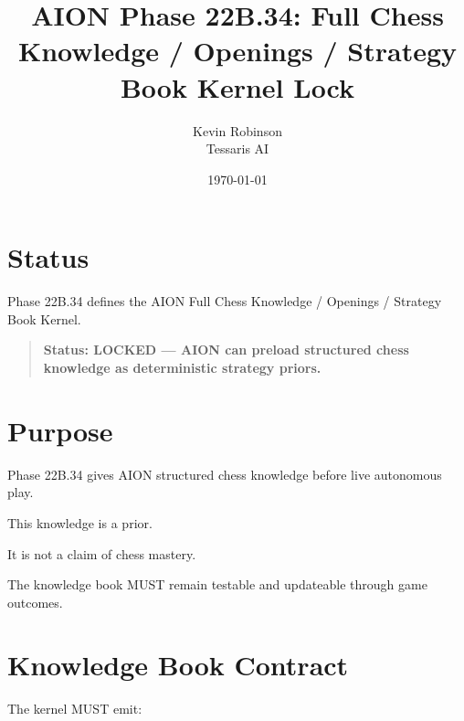 \documentclass[11pt,a4paper]{article}
\title{\textbf{AION Phase 22B.34: Full Chess Knowledge / Openings / Strategy Book Kernel Lock}}
\author{Kevin Robinson\\Tessaris AI}
\date{\today}
\begin{document}
\maketitle

\section{Status}

Phase 22B.34 defines the AION Full Chess Knowledge / Openings / Strategy Book Kernel.

\begin{quote}
\textbf{Status: LOCKED --- AION can preload structured chess knowledge as deterministic strategy priors.}
\end{quote}

\section{Purpose}

Phase 22B.34 gives AION structured chess knowledge before live autonomous play.

This knowledge is a prior.

It is not a claim of chess mastery.

The knowledge book MUST remain testable and updateable through game outcomes.

\section{Knowledge Book Contract}

The kernel MUST emit:
\end{document}
